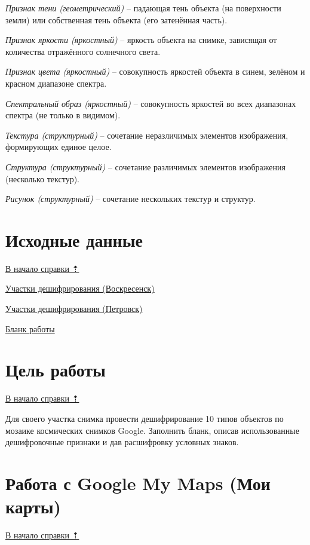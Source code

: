 \documentclass[
  russian,
  letterpaper,
  DIV=11,
  numbers=noendperiod]{scrreprt}
\begin{document}
\emph{Признак тени (геометрический)} -- падающая тень объекта (на
поверхности земли) или собственная тень объекта (его затенённая часть).

\emph{Признак яркости (яркостный)} -- яркость объекта на снимке,
зависящая от количества отражённого солнечного света.

\emph{Признак цвета (яркостный)} -- совокупность яркостей объекта в
синем, зелёном и красном диапазоне спектра.

\emph{Спектральный образ (яркостный)} -- совокупность яркостей во всех
диапазонах спектра (не только в видимом).

\emph{Текстура (структурный)} -- сочетание неразличимых элементов
изображения, формирующих единое целое.

\emph{Структура (структурный)} -- сочетание различимых элементов
изображения (несколько текстур).

\emph{Рисунок (структурный)} -- сочетание нескольких текстур и структур.

\section{Исходные данные}\label{interpretation-data}

\hyperref[interpretation]{В начало справки ⇡}

\href{https://yadi.sk/d/eOVRxRZiEh_PWQ}{Участки дешифрирования
(Воскресенск)}

\href{https://disk.yandex.ru/d/_00irQJ8Kw3bWQ}{Участки дешифрирования
(Петровск)}

\href{https://yadi.sk/i/x5atjx5eSHcTGw}{Бланк работы}

\section{Цель работы}\label{interpretation-task}

\hyperref[interpretation]{В начало справки ⇡}

Для своего участка снимка провести дешифрирование 10 типов объектов по
мозаике космических снимков Google. Заполнить бланк, описав
использованные дешифровочные признаки и дав расшифровку условных знаков.

\section{Работа с Google My Maps (Мои
карты)}\label{interpretation-google}

\hyperref[interpretation]{В начало справки ⇡}
\end{document}
